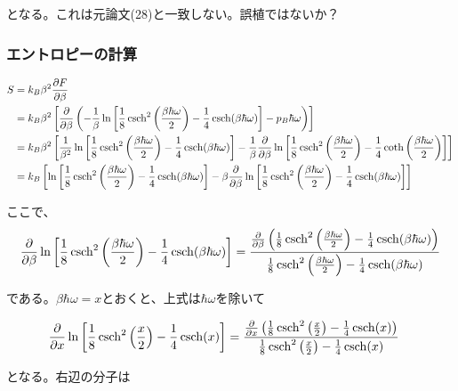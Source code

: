 \documentclass[a4paper,11pt]{jsarticle}
\numberwithin{equation}{section}
\begin{document}
となる。これは元論文(28)と一致しない。誤植ではないか？\\

\subsubsection{エントロピーの計算}
\begin{align}
S &= k_B\beta^2\frac{\partial F}{\partial\beta}\\
  &= k_B\beta^2\left[\frac{\partial}{\partial\beta}\left(-\frac{1}{\beta}\ln\left[\frac{1}{8}\csch^2\left(\frac{\beta\hbar\omega}{2}\right)-\frac{1}{4}\csch(\beta\hbar\omega)\right]-p_B\hbar\omega\right)\right]\\
  &= k_B\beta^2\left[\frac{1}{\beta^2}\ln\left[\frac{1}{8}\csch^2\left(\frac{\beta\hbar\omega}{2}\right)-\frac{1}{4}\csch(\beta\hbar\omega)\right]-\frac{1}{\beta}\frac{\partial}{\partial\beta} \ln\left[\frac{1}{8}\csch^2\left(\frac{\beta\hbar\omega}{2}\right)-\frac{1}{4}\coth\left(\frac{\beta\hbar\omega}{2}\right)\right]\right]\\
  &= k_B\left[\ln\left[\frac{1}{8}\csch^2\left(\frac{\beta\hbar\omega}{2}\right)-\frac{1}{4}\csch(\beta\hbar\omega)\right]-\beta\frac{\partial}{\partial\beta} \ln\left[\frac{1}{8}\csch^2\left(\frac{\beta\hbar\omega}{2}\right)-\frac{1}{4}\csch(\beta\hbar\omega)\right]\right]
\end{align}

ここで、
\begin{align}
  \frac{\partial}{\partial\beta} \ln\left[\frac{1}{8}\csch^2\left(\frac{\beta\hbar\omega}{2}\right)-\frac{1}{4}\csch(\beta\hbar\omega)\right]
  &= \frac{\frac{\partial}{\partial\beta}\left(\frac{1}{8}\csch^2\left(\frac{\beta\hbar\omega}{2}\right)-\frac{1}{4}\csch(\beta\hbar\omega)\right)}{\frac{1}{8}\csch^2\left(\frac{\beta\hbar\omega}{2}\right)-\frac{1}{4}\csch(\beta\hbar\omega)}\notag\\
\end{align}

である。$\beta\hbar\omega=x$とおくと、上式は$\hbar\omega$を除いて

\begin{align}
  \frac{\partial}{\partial x}\ln\left[\frac{1}{8}\csch^2\left(\frac{x}{2}\right)-\frac{1}{4}\csch(x)\right]
  &= \frac{\frac{\partial}{\partial x}\left(\frac{1}{8}\csch^2\left(\frac{x}{2}\right)-\frac{1}{4}\csch(x)\right)}{\frac{1}{8}\csch^2\left(\frac{x}{2}\right)-\frac{1}{4}\csch(x)}
\end{align}

となる。右辺の分子は
\end{document}
